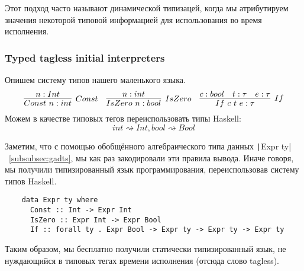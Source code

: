 Этот подход часто называют динамической типизацей, когда мы атрибутируем значения некоторой типовой информацией для использования во время исполнения.

\subsubsection{Typed tagless initial interpreters}

Опишем систему типов нашего маленького языка.
\begin{equation*}{}
    \infer[Const]{Const~n : int}{n : Int}
    \quad
    \infer[IsZero]{IsZero~n : bool}{n : int}
    \quad
    \infer[If]{If~c~t~e : \tau}{c : bool & t : \tau & e : \tau}
\end{equation*}
Можем в качестве типовых тегов переиспользовать типы Haskell: \[int \rightsquigarrow Int, bool \rightsquigarrow Bool\]

Заметим, что с помощью обобщённого алгебраического типа данных \texttt|Expr ty|~\ref{subsubsec:gadts}, мы как раз закодировали эти правила вывода.
Иначе говоря, мы получили типизированный язык программирования, переиспользовав систему типов Haskell.
\begin{verbatim}
    data Expr ty where
      Const :: Int -> Expr Int
      IsZero :: Expr Int -> Expr Bool
      If :: forall ty . Expr Bool -> Expr ty -> Expr ty -> Expr ty
\end{verbatim}

Таким образом, мы бесплатно получили статически типизированный язык, не нуждающийся в типовых тегах времени исполнения (отсюда слово tagless).




